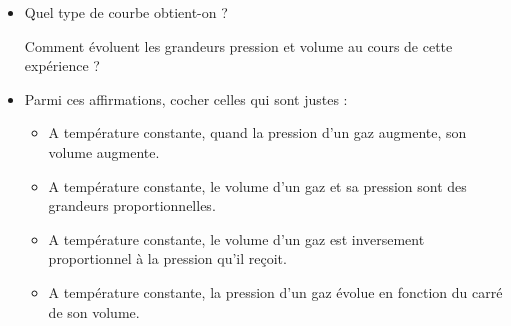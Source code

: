 \documentclass[11pt,a4paper]{article}
\begin{document}
\begin{itemize}
    \item 


  Quel type de courbe obtient-on ? \\[3mm]

 \dotfill 
 
  Comment évoluent les grandeurs pression et volume au cours de cette expérience ? \\[3mm]

 \dotfill 

 \vspace{3mm}

 \dotfill 

 
 
\item Parmi ces affirmations, cocher celles qui sont justes : \\[3mm]

 \begin{itemize}[label=$\square$]
 

  \item A température constante, quand la pression d'un gaz augmente, son volume augmente. 
  
  \item A température constante, le volume d'un gaz et sa pression sont des grandeurs       proportionnelles. 
  
   \item A température constante, le volume d’un gaz est inversement proportionnel à la pression        qu’il reçoit. 
   
   \item A température constante, la pression d'un gaz évolue en fonction du carré de son volume. 

   \end{itemize}
 \end{itemize}
\end{document}
